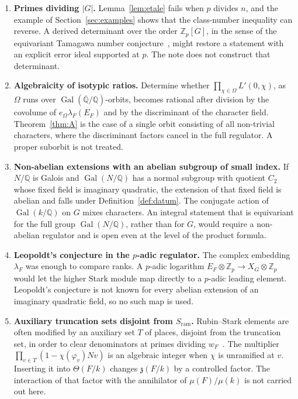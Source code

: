 \documentclass[11pt]{article}
\theoremstyle{plain}
\theoremstyle{definition}
\theoremstyle{remark}
\newcommand{\Z}{\mathbb{Z}}
\newcommand{\Q}{\mathbb{Q}}
\newcommand{\Gal}{\operatorname{Gal}}
\newcommand{\ram}{\mathrm{ram}}
\begin{document}
\begin{enumerate}[label=\textup{(\arabic*)}]
\item \textbf{Primes dividing $|G|$.}
Lemma~\ref{lem:etale} fails when $p$ divides $n$, and the example of Section~\ref{sec:examples} shows that the class-number inequality can reverse.
A derived determinant over the order $\Z_p[G]$, in the sense of the equivariant Tamagawa number conjecture~\cite{BurnsFlach}, might restore a statement with an explicit error ideal supported at $p$.
The note does not construct that determinant.
\item \textbf{Algebraicity of isotypic ratios.}
Determine whether $\prod_{\chi\in\Omega}L'(0,\chi)$, as $\Omega$ runs over $\Gal(\overline{\Q}/\Q)$-orbits, becomes rational after division by the covolume of $e_{\Omega}\lambda_F(E_F)$ and by the discriminant of the character field.
Theorem~\ref{thm:A} is the case of a single orbit consisting of all non-trivial characters, where the discriminant factors cancel in the full regulator.
A proper suborbit is not treated.
\item \textbf{Non-abelian extensions with an abelian subgroup of small index.}
If $N/\Q$ is Galois and $\Gal(N/\Q)$ has a normal subgroup with quotient $C_2$ whose fixed field is imaginary quadratic, the extension of that fixed field is abelian and falls under Definition~\ref{def:datum}.
The conjugate action of $\Gal(k/\Q)$ on $G$ mixes characters.
An integral statement that is equivariant for the full group $\Gal(N/\Q)$, rather than for $G$, would require a non-abelian regulator and is open even at the level of the product formula.
\item \textbf{Leopoldt's conjecture in the $p$-adic regulator.}
The complex embedding $\lambda_F$ was enough to compare ranks.
A $p$-adic logarithm $E_F\otimes\Z_p\to X_G\otimes\Z_p$ would let the higher Stark module map directly to a $p$-adic leading element.
Leopoldt's conjecture is not known for every abelian extension of an imaginary quadratic field, so no such map is used.
\item \textbf{Auxiliary truncation sets disjoint from $S_{\ram}$.}
Rubin--Stark elements are often modified by an auxiliary set $T$ of places, disjoint from the truncation set, in order to clear denominators at primes dividing $w_F$~\cite{RubinStark}.
The multiplier $\prod_{v\in T}(1-\chi(\varphi_v)Nv)$ is an algebraic integer when $\chi$ is unramified at $v$.
Inserting it into $\Theta(F/k)$ changes $\mathfrak{z}(F/k)$ by a controlled factor.
The interaction of that factor with the annihilator of $\mu(F)/\mu(k)$ is not carried out here.
\end{enumerate}
\end{document}
